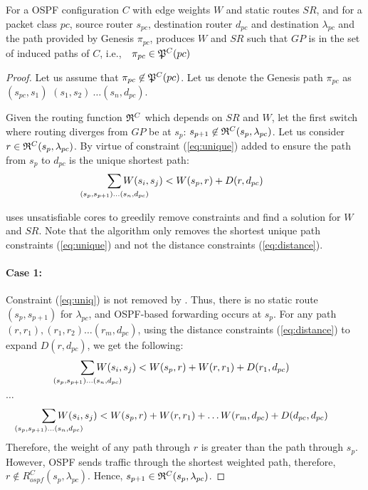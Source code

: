 \begin{theorem}
	For a OSPF configuration $C$ with edge weights $W$ and
	static routes $SR$, and for a packet class $pc$, source router $s_{pc}$, destination router $d_{pc}$ and destination $\lambda_{pc}$ and the path provided by Genesis $\pi_{pc}$,  produces $W$ and $SR$ 
	such that $GP$	is in the set of induced paths of $C$, i.e., $~~\pi_{pc} \in \mathfrak{P}^C(pc)$
\end{theorem}
\begin{proof}
Let us assume that $\pi_{pc} \not\in \mathfrak{P}^C(pc)$. 
Let us denote the 
Genesis path $\pi_{pc}$ as $(s_{pc}, s_1)$ $ (s_1, s_2) \
\ldots (s_n, d_{pc})$. 

Given the routing function $\mathfrak{R}^C$ which depends on $SR$ and
$W$, let the first switch where routing diverges from $GP$ be at $s_p$: 
$s_{p+1} \not\in \mathfrak{R}^C(s_{p}, \lambda_{pc})$. Let us consider  $r \in \mathfrak{R}^C(s_{p}, \lambda_{pc})$. By virtue of
constraint (\ref{eq:unique}) added to ensure the path from $s_{p}$
to $d_{pc}$ is the unique shortest path: 
\begin{equation} \label{eq:uniq}
\sum_{\mathclap{\substack{(s_{p},s_{p+1})\ldots(s_{n},d_{pc})}}} 
W(s_i, s_j) < W(s_{p}, r) + D(r, d_{pc})
\end{equation}

 uses unsatisfiable cores to greedily remove 
constraints and find a solution for $W$ and $SR$. Note that 
the algorithm only removes the shortest unique path 
constraints (\ref{eq:unique}) and 
not the distance constraints (\ref{eq:distance}).
\paragraph{Case 1:} Constraint (\ref{eq:uniq}) is not removed by 
\Cref{alg:unsat}. Thus, there is no static route $(s_p, s_{p+1})$ for
$\lambda_{pc}$, and OSPF-based forwarding occurs at $s_{p}$. 
For any path $(r, r_1), (r_1, r_2) \ldots (r_m, d_{pc})$, 
using the distance constraints (\ref{eq:distance}) to
expand $D(r, d_{pc})$, we get the following: 
\[
\sum_{\mathclap{\substack{(s_{p},s_{p+1})\ldots(s_{n},d_{pc})}}} 
W(s_i, s_j) < W(s_{p}, r) + W(r, r_{1}) + D(r_{1}, d_{pc})
\]
\begin{center}
	$\ldots$
\end{center}
\[
\sum_{\mathclap{\substack{(s_{p},s_{p+1})\ldots(s_{n},d_{pc})}}} 
W(s_i, s_j) < W(s_{p}, r) + W(r, r_{1}) + \ldots W(r_{m}, d_{pc}) + D(d_{pc}, d_{pc})
\]
Therefore, the weight of any path through $r$ is greater than 
the path through $s_{p}$. However, 
OSPF sends traffic through the shortest weighted
path, therefore, $r \not\in R^C_{ospf}(s_p, \lambda_{pc})$. Hence, 
$s_{p+1} \in \mathfrak{R}^C(s_{p}, \lambda_{pc})$.


\end{proof}
